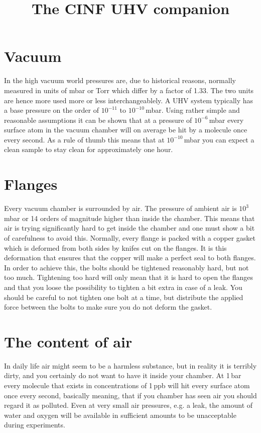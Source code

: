\documentclass[a4paper,english]{article}
\begin{document}
\title{The CINF UHV companion}

\maketitle

\section{Vacuum}
In the high vacuum world pressures are, due to historical reasons, normally measured in units of mbar or Torr which differ by a factor of 1.33. The two units are hence more used more or less interchangeablely. A UHV system typically has a base pressure on the order of $10^{-11}$ to $10^{-10}$\,mbar. Using rather simple and reasonable assumptions it can be shown that at a pressure of $10^{-6}$\,mbar every surface atom in the vacuum chamber will on average be hit by a molecule once every second. As a rule of thumb this means that at $10^{-10}$\,mbar you can expect a clean sample to stay clean for approximately one hour.

\section{Flanges}
Every vacuum chamber is surrounded by air. The pressure of ambient air is $10^3$\,mbar or 14 orders of magnitude higher than inside the chamber. This means that air is trying significantly hard to get inside the chamber and one must show a bit of carefulness to avoid this. Normally, every flange is packed with a copper gasket which is deformed from both sides by knifes cut on the flanges. It is this deformation that ensures that the copper will make a perfect seal to both flanges. In order to achieve this, the bolts should be tightened reasonably hard, but not too much. Tightening too hard will only mean that it is hard to open the flanges and that you loose the possibility to tighten a bit extra in case of a leak. You should be careful to not tighten one bolt at a time, but distribute the applied force between the bolts to make sure you do not deform the gasket.

\section{The content of air}
In daily life air might seem to be a harmless substance, but in reality it is terribly dirty, and you certainly do not want to have it inside your chamber. At 1\,bar every molecule that exists in concentrations of 1\,ppb will hit every surface atom once every second, basically meaning, that if you chamber has seen air you should regard it as polluted. Even at very small air pressures, e.g. a leak, the amount of water and oxygen will be available in sufficient amounts to be unacceptable during experiments.
\end{document}
